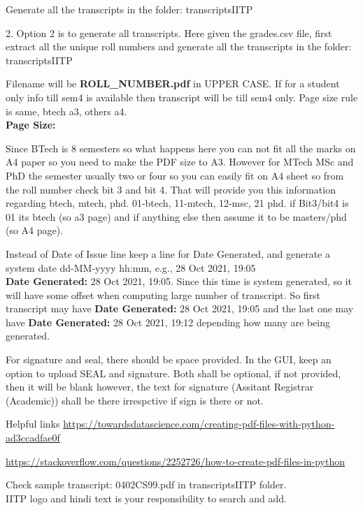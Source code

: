 \documentclass{article}
\begin{document}
Generate all the 
transcripts in the folder:  transcriptsIITP

2. Option 2 is to generate all transcripts. Here given the grades.csv file, 
first extract all the unique roll numbers and generate all the transcripts in 
the folder:  transcriptsIITP

Filename will be \textbf{ROLL\_NUMBER.pdf} in UPPER CASE. 
If for a student only info till sem4 is available then transcript will be till 
sem4 only. Page size rule is same, btech a3, others a4.\\


\textbf{Page Size:}

Since BTech is 8 semesters so what happens here 
you can not fit all the marks on A4 paper so you need to make the PDF size to 
A3. However for MTech MSc and PhD the semester usually two or four so you can 
easily fit on A4 sheet so from the roll number check bit 3 and bit 4. That will 
provide you 
this information regarding btech, mtech, phd. 
01-btech, 11-mtech, 12-msc, 21 phd.
if Bit3/bit4 is 01 its btech (so a3 page) and if anything else 
then assume it to be masters/phd (so A4 page). 

Instead of Date of Issue line keep a line for Date Generated, and generate a 
system date dd-MM-yyyy hh:mm, e.g., 28 Oct 2021, 19:05\\
\textbf{Date Generated:}  28 Oct 2021, 19:05. Since this time is system 
generated, so 
it will have some offset when computing large number of transcript. So first 
transcript may have 
\textbf{Date Generated:}  28 Oct 2021, 19:05 and the last one may have 
\textbf{Date Generated:}  28 Oct 2021, 19:12 depending how many are being 
generated.

For signature and seal, there should be space provided. In the GUI, keep an 
option to upload SEAL and signature. Both shall be optional, if not provided, 
then it will be blank however, the text for signature (Assitant Registrar 
(Academic)) shall be there irrespctive if sign is there or not. 


Helpful links 
\href{https://towardsdatascience.com/creating-pdf-files-with-python-ad3ccadfae0f}{https://towardsdatascience.com/creating-pdf-files-with-python-ad3ccadfae0f}
 

\href{https://stackoverflow.com/questions/2252726/how-to-create-pdf-files-in-python}{https://stackoverflow.com/questions/2252726/how-to-create-pdf-files-in-python}


Check sample transcript: 0402CS99.pdf in 	transcriptsIITP folder.\\
IITP logo and hindi text is your responsibility to search and add.
\end{document}
